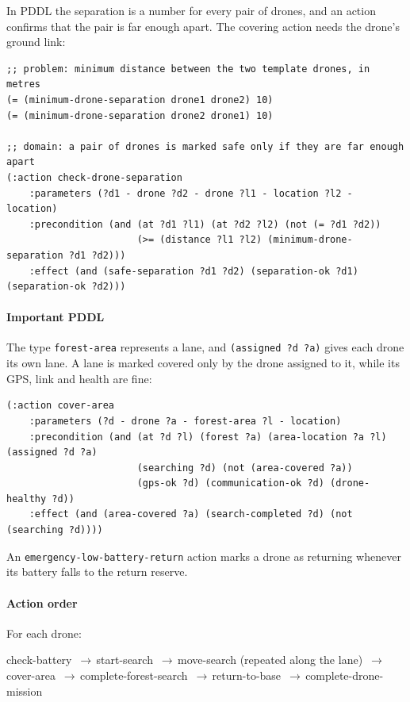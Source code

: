 \documentclass[11pt,a4paper,oneside]{report}
\newcommand{\code}[1]{\texttt{#1}}
\newcommand{\then}{\,{\color{amber!80!black}$\boldsymbol{\rightarrow}$}\allowbreak\,}
\newcommand{\actionflow}[1]{%
  \par\begin{tcolorbox}[colback=codebg,colframe=coderule,boxrule=0.4pt,arc=2pt,
      left=5pt,right=5pt,top=2pt,bottom=2pt,before skip=6pt,after skip=8pt]
    \footnotesize\ttfamily\raggedright\setstretch{1.25}#1
  \end{tcolorbox}}
\begin{document}
\noindent In PDDL the separation is a number for every pair of drones, and an action confirms
that the pair is far enough apart. The covering action needs the drone's ground link:

\begin{lstlisting}
;; problem: minimum distance between the two template drones, in metres
(= (minimum-drone-separation drone1 drone2) 10)
(= (minimum-drone-separation drone2 drone1) 10)

;; domain: a pair of drones is marked safe only if they are far enough apart
(:action check-drone-separation
    :parameters (?d1 - drone ?d2 - drone ?l1 - location ?l2 - location)
    :precondition (and (at ?d1 ?l1) (at ?d2 ?l2) (not (= ?d1 ?d2))
                       (>= (distance ?l1 ?l2) (minimum-drone-separation ?d1 ?d2)))
    :effect (and (safe-separation ?d1 ?d2) (separation-ok ?d1) (separation-ok ?d2)))
\end{lstlisting}

\paragraph{Important PDDL}
The type \code{forest-area} represents a lane, and \code{(assigned ?d ?a)} gives each drone its
own lane. A lane is marked covered only by the drone assigned to it, while its GPS, link and
health are fine:

\begin{lstlisting}
(:action cover-area
    :parameters (?d - drone ?a - forest-area ?l - location)
    :precondition (and (at ?d ?l) (forest ?a) (area-location ?a ?l) (assigned ?d ?a)
                       (searching ?d) (not (area-covered ?a))
                       (gps-ok ?d) (communication-ok ?d) (drone-healthy ?d))
    :effect (and (area-covered ?a) (search-completed ?d) (not (searching ?d))))
\end{lstlisting}

\noindent An \code{emergency-low-battery-return} action marks a drone as returning whenever its
battery falls to the return reserve.

\paragraph{Action order}
For each drone:
\actionflow{check-battery \then start-search \then move-search (repeated along the lane) \then
cover-area \then complete-forest-search \then return-to-base \then complete-drone-mission}
\end{document}
